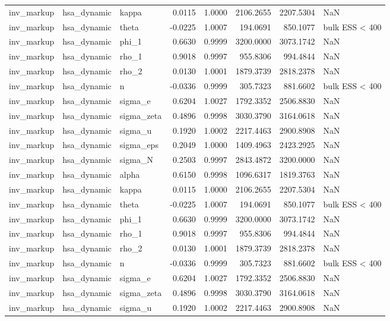 \begin{tabular}{lllrrrrl}
inv\_markup & hsa\_dynamic & kappa & 0.0115 & 1.0000 & 2106.2655 & 2207.5304 & NaN \\
inv\_markup & hsa\_dynamic & theta & -0.0225 & 1.0007 & 194.0691 & 850.1077 & bulk ESS < 400 \\
inv\_markup & hsa\_dynamic & phi\_1 & 0.6630 & 0.9999 & 3200.0000 & 3073.1742 & NaN \\
inv\_markup & hsa\_dynamic & rho\_1 & 0.9018 & 0.9997 & 955.8306 & 994.4844 & NaN \\
inv\_markup & hsa\_dynamic & rho\_2 & 0.0130 & 1.0001 & 1879.3739 & 2818.2378 & NaN \\
inv\_markup & hsa\_dynamic & n & -0.0336 & 0.9999 & 305.7323 & 881.6602 & bulk ESS < 400 \\
inv\_markup & hsa\_dynamic & sigma\_e & 0.6204 & 1.0027 & 1792.3352 & 2506.8830 & NaN \\
inv\_markup & hsa\_dynamic & sigma\_zeta & 0.4896 & 0.9998 & 3030.3790 & 3164.0618 & NaN \\
inv\_markup & hsa\_dynamic & sigma\_u & 0.1920 & 1.0002 & 2217.4463 & 2900.8908 & NaN \\
inv\_markup & hsa\_dynamic & sigma\_eps & 0.2049 & 1.0000 & 1409.4963 & 2423.2925 & NaN \\
inv\_markup & hsa\_dynamic & sigma\_N & 0.2503 & 0.9997 & 2843.4872 & 3200.0000 & NaN \\
inv\_markup & hsa\_dynamic & alpha & 0.6150 & 0.9998 & 1096.6317 & 1819.3763 & NaN \\
inv\_markup & hsa\_dynamic & kappa & 0.0115 & 1.0000 & 2106.2655 & 2207.5304 & NaN \\
inv\_markup & hsa\_dynamic & theta & -0.0225 & 1.0007 & 194.0691 & 850.1077 & bulk ESS < 400 \\
inv\_markup & hsa\_dynamic & phi\_1 & 0.6630 & 0.9999 & 3200.0000 & 3073.1742 & NaN \\
inv\_markup & hsa\_dynamic & rho\_1 & 0.9018 & 0.9997 & 955.8306 & 994.4844 & NaN \\
inv\_markup & hsa\_dynamic & rho\_2 & 0.0130 & 1.0001 & 1879.3739 & 2818.2378 & NaN \\
inv\_markup & hsa\_dynamic & n & -0.0336 & 0.9999 & 305.7323 & 881.6602 & bulk ESS < 400 \\
inv\_markup & hsa\_dynamic & sigma\_e & 0.6204 & 1.0027 & 1792.3352 & 2506.8830 & NaN \\
inv\_markup & hsa\_dynamic & sigma\_zeta & 0.4896 & 0.9998 & 3030.3790 & 3164.0618 & NaN \\
inv\_markup & hsa\_dynamic & sigma\_u & 0.1920 & 1.0002 & 2217.4463 & 2900.8908 & NaN \\

\end{tabular}
